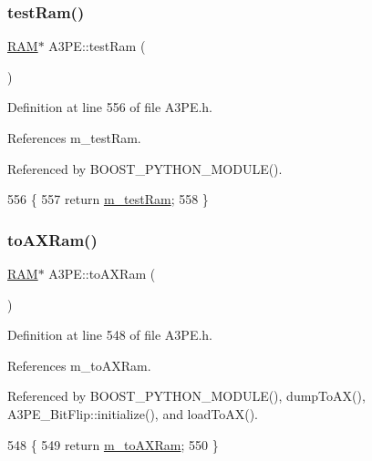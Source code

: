 \subsubsection{\texorpdfstring{test\+Ram()}{testRam()}}
{\footnotesize\ttfamily \hyperlink{classRAM}{R\+AM}$\ast$ A3\+P\+E\+::test\+Ram (\begin{DoxyParamCaption}{ }\end{DoxyParamCaption})\hspace{0.3cm}{\ttfamily [inline]}}



Definition at line 556 of file A3\+P\+E.\+h.



References m\+\_\+test\+Ram.



Referenced by B\+O\+O\+S\+T\+\_\+\+P\+Y\+T\+H\+O\+N\+\_\+\+M\+O\+D\+U\+L\+E().


\begin{DoxyCode}
556                 \{
557     \textcolor{keywordflow}{return} \hyperlink{classA3PE_ad788e41ef5c674ab1a7671f3db0ffef6}{m\_testRam};
558   \}
\end{DoxyCode}
\mbox{\label{classA3PE_a16b16ac12705b9dd93d70fa172deb584}} 
\subsubsection{\texorpdfstring{to\+A\+X\+Ram()}{toAXRam()}}
{\footnotesize\ttfamily \hyperlink{classRAM}{R\+AM}$\ast$ A3\+P\+E\+::to\+A\+X\+Ram (\begin{DoxyParamCaption}{ }\end{DoxyParamCaption})\hspace{0.3cm}{\ttfamily [inline]}}



Definition at line 548 of file A3\+P\+E.\+h.



References m\+\_\+to\+A\+X\+Ram.



Referenced by B\+O\+O\+S\+T\+\_\+\+P\+Y\+T\+H\+O\+N\+\_\+\+M\+O\+D\+U\+L\+E(), dump\+To\+A\+X(), A3\+P\+E\+\_\+\+Bit\+Flip\+::initialize(), and load\+To\+A\+X().


\begin{DoxyCode}
548                 \{
549     \textcolor{keywordflow}{return} \hyperlink{classA3PE_ae586a3d2fd21556e84e1af656e3430b5}{m\_toAXRam};
550   \}
\end{DoxyCode}
\mbox{\label{classA3PE_af6e9e980e871fcf0e1b35e1b4ae95ebe}} 
